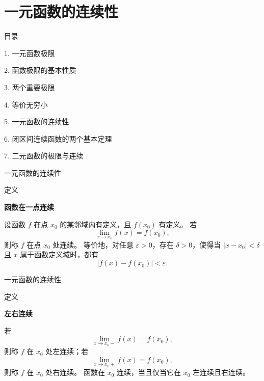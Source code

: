 \documentclass[aspectratio=169,10pt,fontset=fandol]{ctexbeamer}
\begin{document}
\section{一元函数的连续性}
\begin{frame}[t,fragile]{目录}
\normalsize
{\color{black}\normalsize 1. 一元函数极限\par}\vspace{0.3em}
{\color{black}\normalsize 2. 函数极限的基本性质\par}\vspace{0.3em}
{\color{black}\normalsize 3. 两个重要极限\par}\vspace{0.3em}
{\color{black}\normalsize 4. 等价无穷小\par}\vspace{0.3em}
{\color{blue}\normalsize 5. 一元函数的连续性\par}\vspace{0.3em}
{\color{gray!40}\normalsize 6. 闭区间连续函数的两个基本定理\par}\vspace{0.3em}
{\color{gray!40}\normalsize 7. 二元函数的极限与连续\par}\vspace{0.3em}
\end{frame}
\begin{frame}[t,fragile]{一元函数的连续性}
\footnotesize
\begin{block}{定义}
{\footnotesize
\textbf{函数在一点连续}\par

设函数 $f$ 在点 $x_0$ 的某邻域内有定义，且 $f(x_0)$ 有定义。 若
\[
\lim_{x\to x_0}f(x)=f(x_0),
\]
则称 $f$ 在点 $x_0$ 处连续。 等价地，对任意 $\varepsilon>0$，存在 $\delta>0$，使得当 $|x-x_0|<\delta$ 且 $x$ 属于函数定义域时，都有
\[
|f(x)-f(x_0)|<\varepsilon.
\]

}
\end{block}
\end{frame}
\begin{frame}[t,fragile]{一元函数的连续性}
\footnotesize
\begin{block}{定义}
{\footnotesize
\textbf{左右连续}\par

若
\[
\lim_{x\to x_0-}f(x)=f(x_0),
\]
则称 $f$ 在 $x_0$ 处左连续；若
\[
\lim_{x\to x_0+}f(x)=f(x_0),
\]
则称 $f$ 在 $x_0$ 处右连续。 函数在 $x_0$ 连续，当且仅当它在 $x_0$ 左连续且右连续。

}
\end{block}
\end{frame}
\end{document}
